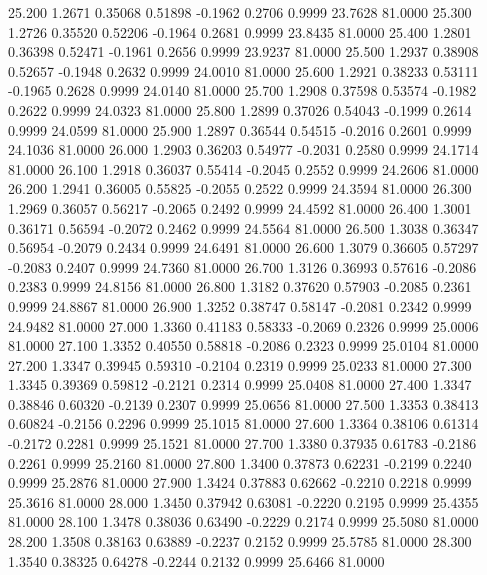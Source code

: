  25.200   1.2671   0.35068   0.51898  -0.1962   0.2706   0.9999  23.7628  81.0000
  25.300   1.2726   0.35520   0.52206  -0.1964   0.2681   0.9999  23.8435  81.0000
  25.400   1.2801   0.36398   0.52471  -0.1961   0.2656   0.9999  23.9237  81.0000
  25.500   1.2937   0.38908   0.52657  -0.1948   0.2632   0.9999  24.0010  81.0000
  25.600   1.2921   0.38233   0.53111  -0.1965   0.2628   0.9999  24.0140  81.0000
  25.700   1.2908   0.37598   0.53574  -0.1982   0.2622   0.9999  24.0323  81.0000
  25.800   1.2899   0.37026   0.54043  -0.1999   0.2614   0.9999  24.0599  81.0000
  25.900   1.2897   0.36544   0.54515  -0.2016   0.2601   0.9999  24.1036  81.0000
  26.000   1.2903   0.36203   0.54977  -0.2031   0.2580   0.9999  24.1714  81.0000
  26.100   1.2918   0.36037   0.55414  -0.2045   0.2552   0.9999  24.2606  81.0000
  26.200   1.2941   0.36005   0.55825  -0.2055   0.2522   0.9999  24.3594  81.0000
  26.300   1.2969   0.36057   0.56217  -0.2065   0.2492   0.9999  24.4592  81.0000
  26.400   1.3001   0.36171   0.56594  -0.2072   0.2462   0.9999  24.5564  81.0000
  26.500   1.3038   0.36347   0.56954  -0.2079   0.2434   0.9999  24.6491  81.0000
  26.600   1.3079   0.36605   0.57297  -0.2083   0.2407   0.9999  24.7360  81.0000
  26.700   1.3126   0.36993   0.57616  -0.2086   0.2383   0.9999  24.8156  81.0000
  26.800   1.3182   0.37620   0.57903  -0.2085   0.2361   0.9999  24.8867  81.0000
  26.900   1.3252   0.38747   0.58147  -0.2081   0.2342   0.9999  24.9482  81.0000
  27.000   1.3360   0.41183   0.58333  -0.2069   0.2326   0.9999  25.0006  81.0000
  27.100   1.3352   0.40550   0.58818  -0.2086   0.2323   0.9999  25.0104  81.0000
  27.200   1.3347   0.39945   0.59310  -0.2104   0.2319   0.9999  25.0233  81.0000
  27.300   1.3345   0.39369   0.59812  -0.2121   0.2314   0.9999  25.0408  81.0000
  27.400   1.3347   0.38846   0.60320  -0.2139   0.2307   0.9999  25.0656  81.0000
  27.500   1.3353   0.38413   0.60824  -0.2156   0.2296   0.9999  25.1015  81.0000
  27.600   1.3364   0.38106   0.61314  -0.2172   0.2281   0.9999  25.1521  81.0000
  27.700   1.3380   0.37935   0.61783  -0.2186   0.2261   0.9999  25.2160  81.0000
  27.800   1.3400   0.37873   0.62231  -0.2199   0.2240   0.9999  25.2876  81.0000
  27.900   1.3424   0.37883   0.62662  -0.2210   0.2218   0.9999  25.3616  81.0000
  28.000   1.3450   0.37942   0.63081  -0.2220   0.2195   0.9999  25.4355  81.0000
  28.100   1.3478   0.38036   0.63490  -0.2229   0.2174   0.9999  25.5080  81.0000
  28.200   1.3508   0.38163   0.63889  -0.2237   0.2152   0.9999  25.5785  81.0000
  28.300   1.3540   0.38325   0.64278  -0.2244   0.2132   0.9999  25.6466  81.0000
